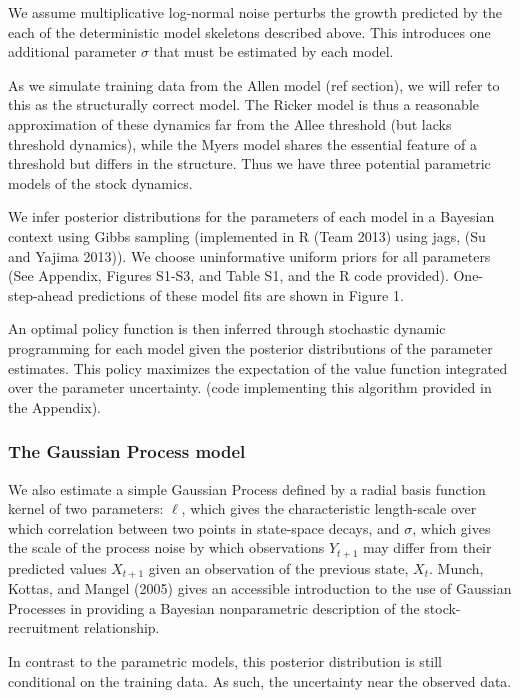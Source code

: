 \documentclass[author-year, review]{elsarticle} %
\begin{document}
We assume multiplicative log-normal noise perturbs the growth predicted
by the each of the deterministic model skeletons described above. This
introduces one additional parameter $\sigma$ that must be estimated by
each model.

As we simulate training data from the Allen model (ref section), we will
refer to this as the structurally correct model. The Ricker model is
thus a reasonable approximation of these dynamics far from the Allee
threshold (but lacks threshold dynamics), while the Myers model shares
the essential feature of a threshold but differs in the structure. Thus
we have three potential parametric models of the stock dynamics.

We infer posterior distributions for the parameters of each model in a
Bayesian context using Gibbs sampling (implemented in R (Team 2013)
using jags, (Su and Yajima 2013)). We choose uninformative uniform
priors for all parameters (See Appendix, Figures S1-S3, and Table S1,
and the R code provided). One-step-ahead predictions of these model fits
are shown in Figure 1.

An optimal policy function is then inferred through stochastic dynamic
programming for each model given the posterior distributions of the
parameter estimates. This policy maximizes the expectation of the value
function integrated over the parameter uncertainty. (code implementing
this algorithm provided in the Appendix).

\subsubsection{The Gaussian Process
model}\label{the-gaussian-process-model}

We also estimate a simple Gaussian Process defined by a radial basis
function kernel of two parameters: $\ell$, which gives the
characteristic length-scale over which correlation between two points in
state-space decays, and $\sigma$, which gives the scale of the process
noise by which observations $Y_{t+1}$ may differ from their predicted
values $X_{t+1}$ given an observation of the previous state, $X_t$.
Munch, Kottas, and Mangel (2005) gives an accessible introduction to the
use of Gaussian Processes in providing a Bayesian nonparametric
description of the stock-recruitment relationship.

In contrast to the parametric models, this posterior distribution is
still conditional on the training data. As such, the uncertainty near
the observed data.
\end{document}
